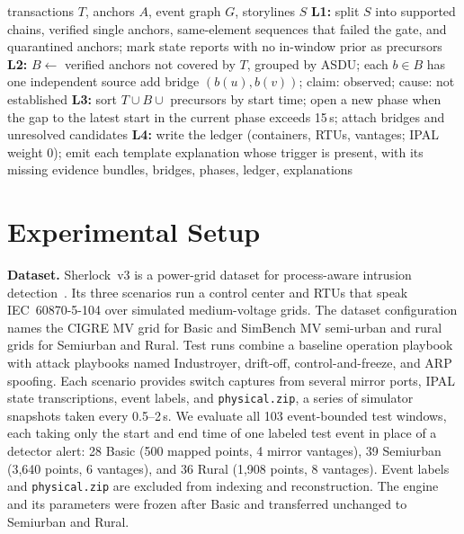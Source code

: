 \documentclass[conference]{IEEEtran}
\begin{document}
\begin{algorithm}[t]
\caption{Four-layer synthesis for one window}
\label{alg:syn}
\footnotesize
\begin{algorithmic}[1]
\Require transactions $T$, anchors $A$, event graph $G$, storylines $S$
\State \textbf{L1:} split $S$ into supported chains, verified single anchors, same-element sequences that failed the gate, and quarantined anchors; mark state reports with no in-window prior as precursors
\State \textbf{L2:} $B\gets$ verified anchors not covered by $T$, grouped by ASDU; each $b\in B$ has one independent source
    \State add bridge $(b(u),b(v))$; claim: observed; cause: not established
  \EndIf
\EndFor
\State \textbf{L3:} sort $T\cup B\cup$ precursors by start time; open a new phase when the gap to the latest start in the current phase exceeds 15\,s; attach bridges and unresolved candidates
\State \textbf{L4:} write the ledger (containers, RTUs, vantages; IPAL weight 0); emit each template explanation whose trigger is present, with its missing evidence
\State \Return bundles, bridges, phases, ledger, explanations
\end{algorithmic}
\end{algorithm}

\section{Experimental Setup}
\textbf{Dataset.}
Sherlock~v3 is a power-grid dataset for process-aware intrusion detection~\cite{wagner2025sherlock,sherlockv3}.
Its three scenarios run a control center and RTUs that speak IEC~60870-5-104 over simulated medium-voltage grids.
The dataset configuration names the CIGRE MV grid for Basic and SimBench MV semi-urban and rural grids for Semiurban and Rural.
Test runs combine a baseline operation playbook with attack playbooks named Industroyer, drift-off, control-and-freeze, and ARP spoofing.
Each scenario provides switch captures from several mirror ports, IPAL state transcriptions, event labels, and \texttt{physical.zip}, a series of simulator snapshots taken every 0.5--2\,s.
We evaluate all 103 event-bounded test windows, each taking only the start and end time of one labeled test event in place of a detector alert: 28 Basic (500 mapped points, 4 mirror vantages), 39 Semiurban (3{,}640 points, 6 vantages), and 36 Rural (1{,}908 points, 8 vantages).
Event labels and \texttt{physical.zip} are excluded from indexing and reconstruction.
The engine and its parameters were frozen after Basic and transferred unchanged to Semiurban and Rural.
\end{document}
